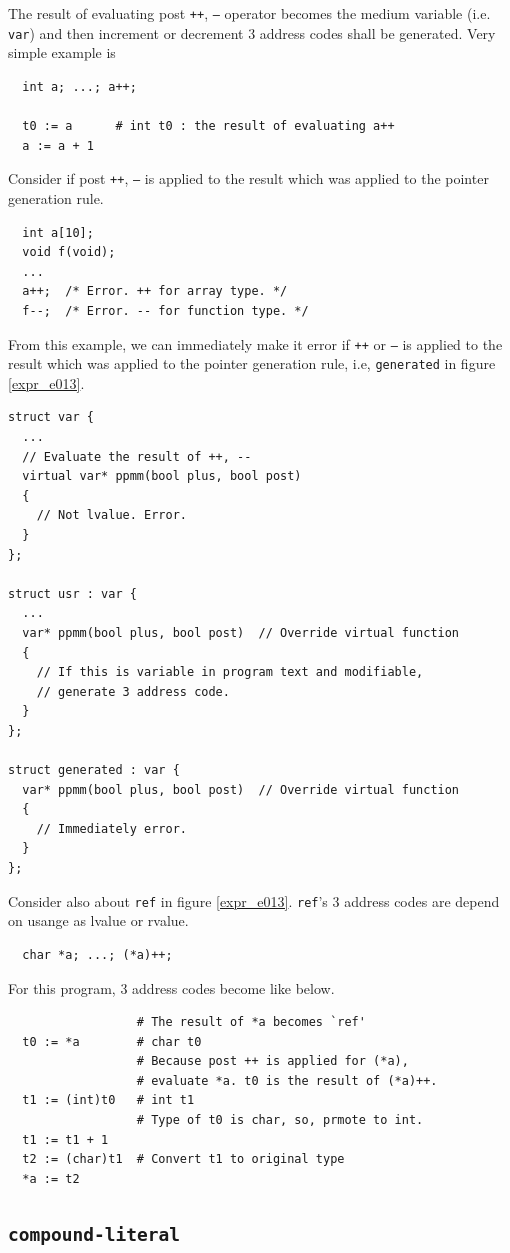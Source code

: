 The result of evaluating post {\tt{++}}, {\tt{--}} operator 
becomes the medium variable (i.e. {\tt{var}}) and then
increment or decrement 3 address codes shall be generated.
Very simple example is
\begin{verbatim}
  int a; ...; a++;

  t0 := a      # int t0 : the result of evaluating a++ 
  a := a + 1
\end{verbatim}

Consider if post {\tt{++}},  {\tt{--}} is applied to the result which was
applied to the pointer generation rule.
\begin{verbatim}
  int a[10];
  void f(void);
  ...
  a++;  /* Error. ++ for array type. */
  f--;  /* Error. -- for function type. */
\end{verbatim}
From this example, we can immediately make it error
if {\tt{++}} or {\tt{--}} is applied to the result which was
applied to the pointer generation rule, i.e, {\tt{generated}} 
in figure \ref{expr_e013}.
\begin{verbatim}
struct var {
  ...
  // Evaluate the result of ++, --
  virtual var* ppmm(bool plus, bool post)
  {
    // Not lvalue. Error.
  }
};

struct usr : var {
  ...
  var* ppmm(bool plus, bool post)  // Override virtual function
  {
    // If this is variable in program text and modifiable,
    // generate 3 address code.
  }
};

struct generated : var {
  var* ppmm(bool plus, bool post)  // Override virtual function
  {
    // Immediately error.
  }
};
\end{verbatim}

Consider also about {\tt{ref}} in figure \ref{expr_e013}.
{\tt{ref}}'s 3 address codes are depend on usange as lvalue or rvalue.
\begin{verbatim}
  char *a; ...; (*a)++;
\end{verbatim}
For this program, 3 address codes become like below.
\begin{verbatim}
                  # The result of *a becomes `ref'
  t0 := *a        # char t0
                  # Because post ++ is applied for (*a),
                  # evaluate *a. t0 is the result of (*a)++.
  t1 := (int)t0   # int t1
                  # Type of t0 is char, so, prmote to int.
  t1 := t1 + 1
  t2 := (char)t1  # Convert t1 to original type
  *a := t2 
\end{verbatim}

\subsection{{\tt{compound-literal}}}


